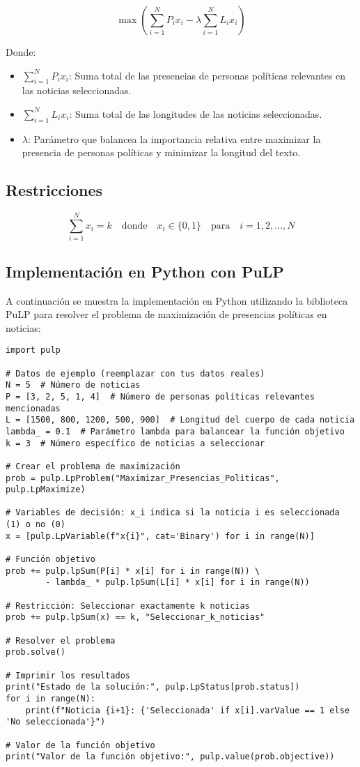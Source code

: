 \documentclass{article}
\begin{document}
\[
\max \left( \sum_{i=1}^{N} P_i x_i - \lambda \sum_{i=1}^{N} L_i x_i \right)
\]

Donde:
\begin{itemize}
  \item \(\sum_{i=1}^{N} P_i x_i\): Suma total de las presencias de personas políticas relevantes en las noticias seleccionadas.
  \item \(\sum_{i=1}^{N} L_i x_i\): Suma total de las longitudes de las noticias seleccionadas.
  \item \(\lambda\): Parámetro que balancea la importancia relativa entre maximizar la presencia de personas políticas y minimizar la longitud del texto.
\end{itemize}

\subsection*{Restricciones}

\[
\sum_{i=1}^{N} x_i = k \quad \text{donde} \quad x_i \in \{0, 1\} \quad \text{para} \quad i = 1, 2, \ldots, N
\]

\subsection*{Implementación en Python con PuLP}

A continuación se muestra la implementación en Python utilizando la biblioteca PuLP para resolver el problema de maximización de presencias políticas en noticias:

\begin{verbatim}
import pulp

# Datos de ejemplo (reemplazar con tus datos reales)
N = 5  # Número de noticias
P = [3, 2, 5, 1, 4]  # Número de personas políticas relevantes mencionadas
L = [1500, 800, 1200, 500, 900]  # Longitud del cuerpo de cada noticia
lambda_ = 0.1  # Parámetro lambda para balancear la función objetivo
k = 3  # Número específico de noticias a seleccionar

# Crear el problema de maximización
prob = pulp.LpProblem("Maximizar_Presencias_Politicas", pulp.LpMaximize)

# Variables de decisión: x_i indica si la noticia i es seleccionada (1) o no (0)
x = [pulp.LpVariable(f"x{i}", cat='Binary') for i in range(N)]

# Función objetivo
prob += pulp.lpSum(P[i] * x[i] for i in range(N)) \
        - lambda_ * pulp.lpSum(L[i] * x[i] for i in range(N))

# Restricción: Seleccionar exactamente k noticias
prob += pulp.lpSum(x) == k, "Seleccionar_k_noticias"

# Resolver el problema
prob.solve()

# Imprimir los resultados
print("Estado de la solución:", pulp.LpStatus[prob.status])
for i in range(N):
    print(f"Noticia {i+1}: {'Seleccionada' if x[i].varValue == 1 else 'No seleccionada'}")

# Valor de la función objetivo
print("Valor de la función objetivo:", pulp.value(prob.objective))
\end{verbatim}
\end{document}
